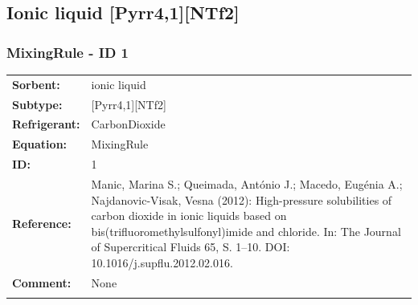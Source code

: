 \subsection{Ionic liquid [Pyrr4,1][NTf2]}
%
\subsubsection{MixingRule - ID 1}
%
\begin{tabular}[l]{|lp{11.5cm}|}
\hline
\addlinespace

\textbf{Sorbent:} & ionic liquid \\
\textbf{Subtype:} & [Pyrr4,1][NTf2] \\
\textbf{Refrigerant:} & CarbonDioxide \\
\textbf{Equation:} & MixingRule \\
\textbf{ID:} & 1 \\
\textbf{Reference:} & Manic, Marina S.; Queimada, António J.; Macedo, Eugénia A.; Najdanovic-Visak, Vesna (2012): High-pressure solubilities of carbon dioxide in ionic liquids based on bis(trifluoromethylsulfonyl)imide and chloride. In: The Journal of Supercritical Fluids 65, S. 1–10. DOI: 10.1016/j.supflu.2012.02.016. \\
\textbf{Comment:} & None \\

\addlinespace
\hline
\end{tabular}
\newline

